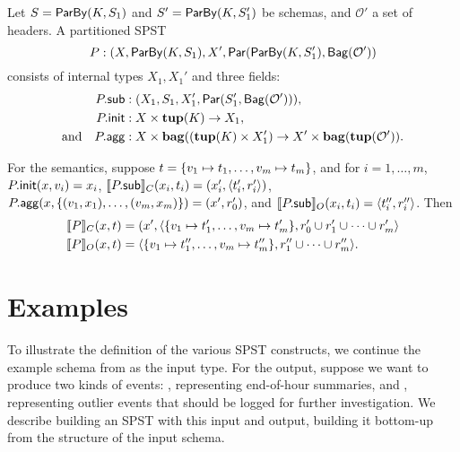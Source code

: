 \begin{definition}
Let $S = \keyby{K}{S_1}$ and $S' = \keyby{K}{S_1'}$ be schemas,
and $\mathcal{O}'$ a set of headers.
A partitioned SPST
\[
P : (X, \keyby{K}{S_1}, X', \parcomp{\keyby{K}{S_1'}}{\relleaf{\mathcal{O}'}}
\]
consists of internal types $X_1, X_1'$ and three fields:
\begin{align*}
\spstfield{P}{sub} &: (X_1, S_1, X_1', \parcomp{S_1'}{\relleaf{\mathcal{O}'}}), \\
\spstfield{P}{init} &: X \times \tup(K) \to X_1, \\
\text{and} \quad
\spstfield{P}{agg} &: X \times \bag((\tup(K) \times X_1') \to X' \times \bag(\tup(\mathcal{O}')).
\end{align*}

For the semantics,
suppose $t = \spsbag{\keyed{v_1}{t_1}, \ldots, \keyed{v_m}{t_m}}$,
and for $i = 1, \ldots, m$,
$\spstfield{P}{init}(x, v_i) = x_i$,
$\spstsemC{x_i}{t_i}{\spstfield{P}{sub}} = (x_i', \spspar{t_i'}{r_i'})$,
$\spstfield{P}{agg}(x, \{(v_1, x_1), \ldots, (v_m, x_m)\}) = (x', r_0')$,
and
$\spstsemO{x_i}{t_i}{\spstfield{P}{sub}} = \spspar{t_i''}{r_i''}$.
Then
\begin{align*}
    \spstsemC{x}{t}{P}
    &= (x', \spspar{ \spsbag{\keyed{v_1}{t_1'}, \ldots, \keyed{v_m}{t_m'}}}{r_0' \cup r_1' \cup \cdots \cup r_m'}
    \\
    \spstsemO{x}{t}{P}
    &= \spspar{\spsbag{\keyed{v_1}{t_1''}, \ldots, \keyed{v_m}{t_m''}}}{r_1'' \cup \cdots \cup r_m''}.
    \quad
\end{align*}
\end{definition}

\section{Examples}
\label{45:ssec:spst-example}

To illustrate the definition of the various SPST constructs,
we continue the example schema from  as the input type.
For the output, suppose we want to produce two kinds of events: ,
representing end-of-hour summaries, and , representing
outlier events that should be logged for further investigation.
We describe building an SPST with this input and output,
building it bottom-up from the structure of the input schema.

